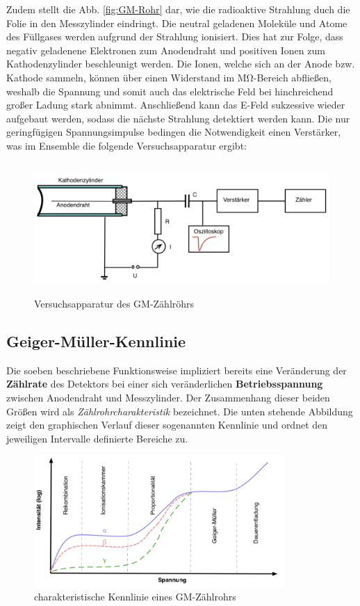 \noindent Zudem stellt die Abb. \ref{fig:GM-Rohr} dar, wie die radioaktive Strahlung duch die Folie in den Messzylinder 
eindringt. Die neutral geladenen Moleküle und Atome des Füllgases werden aufgrund der Strahlung ionisiert. Dies hat zur 
Folge, dass negativ geladenene Elektronen zum Anodendraht und positiven Ionen zum Kathodenzylinder beschleunigt werden.
Die Ionen, welche sich an der Anode bzw. Kathode sammeln, können über einen Widerstand im $\unit{\mega\ohm}$-Bereich 
abfließen, weshalb die Spannung und somit auch das elektrische Feld bei hinchreichend großer Ladung stark abnimmt. 
Anschließend kann das E-Feld sukzessive wieder aufgebaut werden, sodass die nächste Strahlung detektiert werden kann.
Die nur geringfügigen Spannungsimpulse bedingen die Notwendigkeit einen Verstärker, was im Ensemble die folgende 
Versuchsapparatur ergibt:

\begin{figure}[H]
    \centering 
    \includegraphics[height=5cm]{Apparatur.png}
    \caption{Versuchsapparatur des GM-Zählröhrs\cite{Versuchsanleitung_v703}}
    \label{fig:GM-Apparatur}
\end{figure}

\subsection{Geiger-Müller-Kennlinie}

\noindent Die soeben beschriebene Funktionsweise impliziert bereits eine Veränderung der \textbf{Zählrate} des Detektors bei 
einer sich veränderlichen \textbf{Betriebsspannung} zwischen Anodendraht und Messzylinder. Der Zusammenhang dieser beiden 
Größen wird als \emph{Zählrohrcharakteristik} bezeichnet. Die unten stehende Abbildung zeigt den graphischen Verlauf 
dieser sogenannten Kennlinie und ordnet den jeweiligen Intervalle definierte Bereiche zu.

\begin{figure}[H]
    \centering 
    \includegraphics[height=5cm]{Kennlinie.png}
    \caption{charakteristische Kennlinie eines GM-Zählrohrs\cite{KennlinieGM}}
    \label{fig:Kennlinie}
\end{figure}

